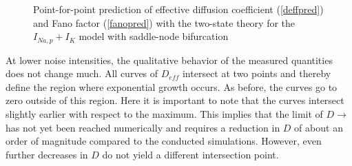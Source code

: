 \documentclass[12pt,a4paper]{article}
\begin{document}
\begin{figure}[H]
	\hspace*{-0.5cm}
	\caption{Point-for-point prediction of effective diffusion coefficient (\ref{deffpred}) and Fano factor (\ref{fanopred}) with the two-state theory for the $I_{Na,p}+I_K$ model with saddle-node bifurcation}
\end{figure}
At lower noise intensities, the qualitative behavior of the measured quantities does not change much. All curves of $D_{eff}$ intersect at two points and thereby define the region where exponential growth occurs. As before, the curves go to zero outside of this region. Here it is important to note that the curves intersect slightly earlier with respect to the maximum. This implies that the limit of $D\rightarrow$ has not yet been reached numerically and requires a reduction in $D$ of about an order of magnitude compared to the conducted simulations. However, even further decreases in $D$ do not yield a different intersection point. \\
\end{document}

